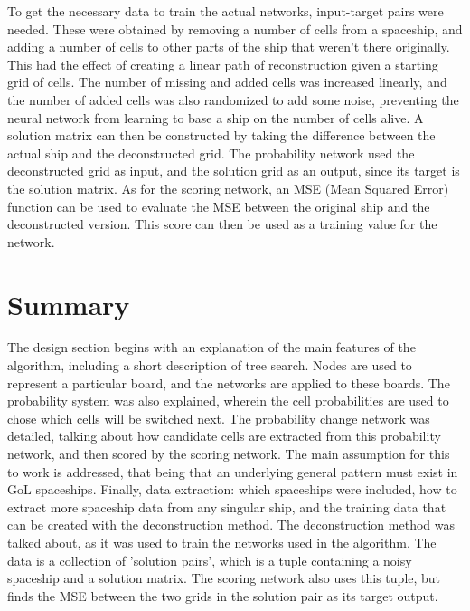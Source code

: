 \documentclass{l4proj}
\begin{document}
To get the necessary data to train the actual networks, input-target pairs were needed. These were obtained by removing a number of cells from a spaceship, and adding a number of cells to other parts of the ship that weren't there originally. This had the effect of creating a linear path of reconstruction given a starting grid of cells. The number of missing and added cells was increased linearly, and the number of added cells was also randomized to add some noise, preventing the neural network from learning to base a ship on the number of cells alive. A solution matrix can then be constructed by taking the difference between the actual ship and the deconstructed grid. The probability network used the deconstructed grid as input, and the solution grid as an output, since its target is the solution matrix. As for the scoring network, an MSE (Mean Squared Error) function can be used to evaluate the MSE between the original ship and the deconstructed version. This score can then be used as a training value for the network. 

\section{Summary}

The design section begins with an explanation of the main features of the algorithm, including a short description of tree search. Nodes are used to represent a particular board, and the networks are applied to these boards. The probability system was also explained, wherein the cell probabilities are used to chose which cells will be switched next. The probability change network was detailed, talking about how candidate cells are extracted from this probability network, and then scored by the scoring network. The main assumption for this to work is addressed, that being that an underlying general pattern must exist in GoL spaceships. Finally, data extraction: which spaceships were included, how to extract more spaceship data from any singular ship, and the training data that can be created with the deconstruction method. The deconstruction method was talked about, as it was used to train the networks used in the algorithm. The data is a collection of 'solution pairs', which is a tuple containing a noisy spaceship and a solution matrix. The scoring network also uses this tuple, but finds the MSE between the two grids in the solution pair as its target output.


\end{document}
